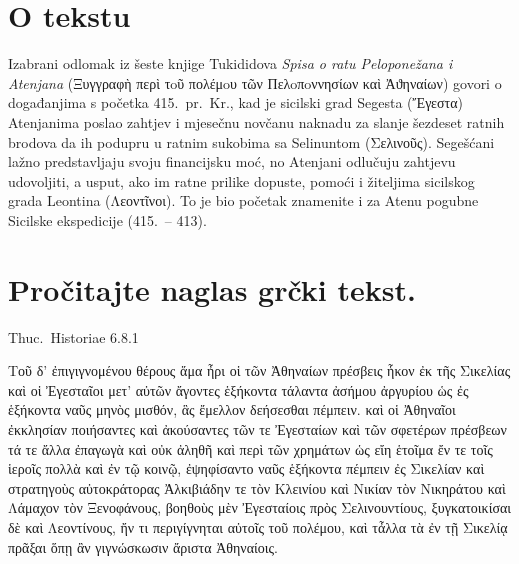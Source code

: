 


\section*{O tekstu}

Izabrani odlomak iz šeste knjige Tukididova \textit{Spisa o ratu Peloponežana i Atenjana} \textgreek[variant=ancient]{(Ξυγγραφὴ περὶ τoῦ πολέμoυ τῶν Пελoπoννησίων καὶ Ἀϑηναίων)} govori o događanjima s početka 415.\ pr.~Kr., kad je sicilski grad Segesta \textgreek[variant=ancient]{(Ἔγεστα)} Atenjanima poslao zahtjev i mjesečnu novčanu naknadu za slanje šezdeset ratnih brodova da ih podupru u ratnim sukobima sa Selinuntom \textgreek[variant=ancient]{(Σελινοῦς).} Segešćani lažno predstavljaju svoju financijsku moć, no Atenjani odlučuju zahtjevu udovoljiti, a usput, ako im ratne prilike dopuste, pomoći i žiteljima sicilskog grada Leontina \textgreek[variant=ancient]{(Λεοντῖνοι).} To je bio početak znamenite i za Atenu pogubne Sicilske ekspedicije (415.\ – 413).


\section*{Pročitajte naglas grčki tekst.}


Thuc.\ Historiae 6.8.1

\medskip

{\large
\begin{greek}
\noindent Τοῦ δ' ἐπιγιγνομένου θέρους ἅμα ἦρι οἱ τῶν Ἀθηναίων πρέσβεις ἧκον ἐκ τῆς Σικελίας καὶ οἱ Ἐγεσταῖοι μετ' αὐτῶν ἄγοντες ἑξήκοντα τάλαντα ἀσήμου ἀργυρίου ὡς ἐς ἑξήκοντα ναῦς μηνὸς μισθόν, ἃς ἔμελλον δεήσεσθαι πέμπειν. καὶ οἱ Ἀθηναῖοι ἐκκλησίαν ποιήσαντες καὶ ἀκούσαντες τῶν τε Ἐγεσταίων καὶ τῶν σφετέρων πρέσβεων τά τε ἄλλα ἐπαγωγὰ καὶ οὐκ ἀληθῆ καὶ περὶ τῶν χρημάτων ὡς εἴη ἑτοῖμα ἔν τε τοῖς ἱεροῖς πολλὰ καὶ ἐν τῷ κοινῷ, ἐψηφίσαντο ναῦς ἑξήκοντα πέμπειν ἐς Σικελίαν καὶ στρατηγοὺς αὐτοκράτορας Ἀλκιβιάδην τε τὸν Κλεινίου καὶ Νικίαν τὸν Νικηράτου καὶ Λάμαχον τὸν Ξενοφάνους, βοηθοὺς μὲν Ἐγεσταίοις πρὸς Σελινουντίους, ξυγκατοικίσαι δὲ καὶ Λεοντίνους, ἤν τι περιγίγνηται αὐτοῖς τοῦ πολέμου, καὶ τἆλλα τὰ ἐν τῇ Σικελίᾳ πρᾶξαι ὅπῃ ἂν γιγνώσκωσιν ἄριστα Ἀθηναίοις.


\end{greek}

}


